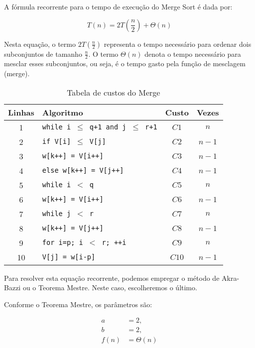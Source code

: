 A fórmula recorrente para o tempo de execução do Merge Sort é dada por:

\begin{equation}
    T(n) = 2T\left(\frac{n}{2}\right) + \Theta(n)
\end{equation}

Nesta equação, o termo \( 2T\left(\frac{n}{2}\right) \) representa o tempo necessário para ordenar dois subconjuntos de tamanho \( \frac{n}{2} \). O termo \( \Theta(n) \) denota o tempo necessário para mesclar esses subconjuntos, ou seja, é o tempo gasto pela função de mesclagem (merge).

\begin{table}[H]
\centering
\caption{Tabela de custos do Merge}
\label{tab:custos_merge}
\begin{tabular}{|c|l|c|c|}
\hline
\textbf{Linhas} & \textbf{Algoritmo} & \textbf{Custo} & \textbf{Vezes} \\ \hline
1 & \texttt{while i \( \leq \) q+1 and j \( \leq \) r+1} & \( C1 \) & \( n \) \\
2 & \texttt{if V[i] \( \leq \) V[j]} & \( C2 \) & \( n-1 \) \\
3 & \texttt{w[k++] = V[i++]} & \( C3 \) & \( n-1 \) \\
4 & \texttt{else w[k++] = V[j++]} & \( C4 \) & \( n-1 \) \\
5 & \texttt{while i \( < \) q} & \( C5 \) & \( n \) \\
6 & \texttt{w[k++] = V[i++]} & \( C6 \) & \( n-1 \) \\
7 & \texttt{while j \( < \) r} & \( C7 \) & \( n \) \\
8 & \texttt{w[k++] = V[j++]} & \( C8 \) & \( n-1 \) \\
9 & \texttt{for i=p; i \( < \) r; ++i} & \( C9 \) & \( n \) \\
10 & \texttt{V[j] = w[i-p]} & \( C10 \) & \( n-1 \) \\ \hline
\end{tabular}
\end{table}


Para resolver esta equação recorrente, podemos empregar o método de Akra-Bazzi ou o Teorema Mestre. Neste caso, escolheremos o último.

Conforme o Teorema Mestre, os parâmetros são:

\begin{align}
    a &= 2, \\
    b &= 2, \\
    f(n) &= \Theta(n)
\end{align}

